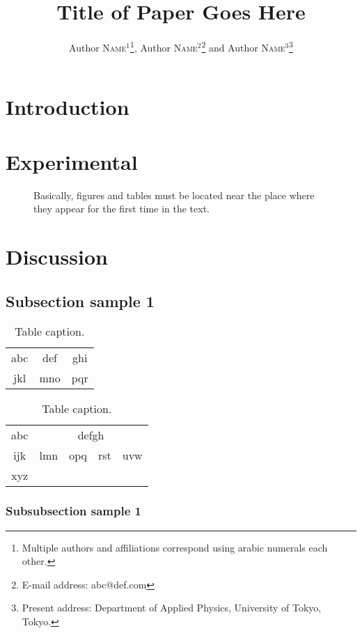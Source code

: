 \documentclass{jpsj2}
\title{Title of Paper Goes Here}
\author{Author \textsc{Name}$^{1}$\thanks{Multiple authors and affiliations correspond using arabic numerals each other.}, Author \textsc{Name}$^{2}$\thanks{E-mail address: abc@def.com} and Author \textsc{Name}$^{3}$\thanks{Present address: Department of Applied Physics, University of Tokyo, Tokyo.}}
\begin{document}
\maketitle

\section{Introduction} %

\section{Experimental}

\begin{figure}[tb]
\caption{Basically, figures and tables must be located near the place where they appear for the first time in the text.}
\label{f1}
\end{figure}

\section{Discussion}

\subsection{Subsection sample 1}

\begin{table}[tb]
\caption{Table caption.}
\label{t1}
\begin{tabular}{ccc}
\hline
abc & def & ghi \\
\cline{2-3}
jkl & mno & pqr \\
\hline
\end{tabular}
\end{table}

\begin{table}[tb]
\caption{Table caption.}
\label{t2}
\begin{tabular}{ccccc}
\hline
abc & \multicolumn{4}{c}{defgh} \\
ijk & lmn & opq & rst & uvw \\
xyz \\
\hline
\end{tabular}
\end{table}

\subsubsection{Subsubsection sample 1}
\end{document}
